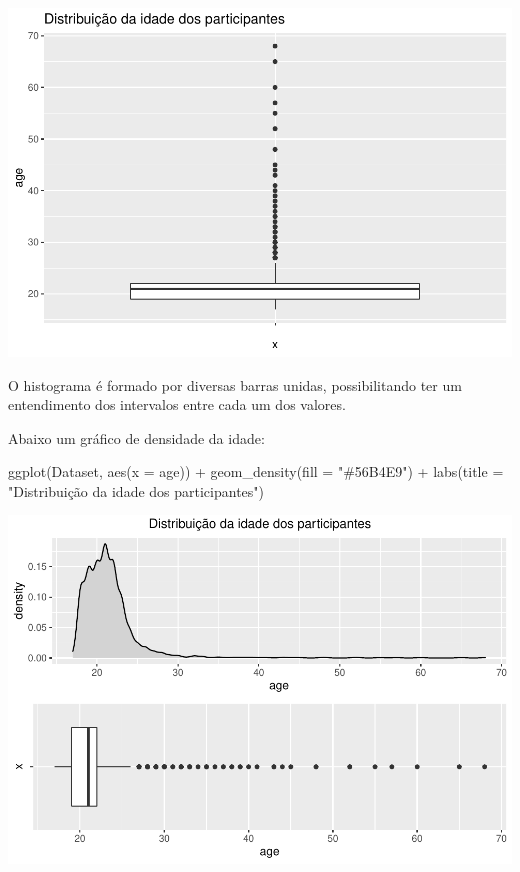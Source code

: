 \documentclass[
]{book}
\newenvironment{Shaded}{\begin{snugshade}}{\end{snugshade}}
\newcommand{\AttributeTok}[1]{\textcolor[rgb]{0.77,0.63,0.00}{#1}}
\newcommand{\FunctionTok}[1]{\textcolor[rgb]{0.00,0.00,0.00}{#1}}
\newcommand{\NormalTok}[1]{#1}
\newcommand{\SpecialCharTok}[1]{\textcolor[rgb]{0.00,0.00,0.00}{#1}}
\newcommand{\StringTok}[1]{\textcolor[rgb]{0.31,0.60,0.02}{#1}}
\begin{document}
\begin{center}\includegraphics{gitbook-demo_files/figure-latex/unnamed-chunk-18-1} \end{center}

O histograma é formado por diversas barras unidas, possibilitando ter um entendimento dos intervalos entre cada um dos valores.

Abaixo um gráfico de densidade da idade:

\begin{Shaded}
\begin{Highlighting}[]
\FunctionTok{ggplot}\NormalTok{(Dataset, }\FunctionTok{aes}\NormalTok{(}\AttributeTok{x =}\NormalTok{ age)) }\SpecialCharTok{+}
  \FunctionTok{geom\_density}\NormalTok{(}\AttributeTok{fill =} \StringTok{"\#56B4E9"}\NormalTok{) }\SpecialCharTok{+}
  \FunctionTok{labs}\NormalTok{(}\AttributeTok{title =} \StringTok{"Distribuição da idade dos participantes"}\NormalTok{)}
\end{Highlighting}
\end{Shaded}

\begin{center}\includegraphics{gitbook-demo_files/figure-latex/unnamed-chunk-19-1} \end{center}
\end{document}
